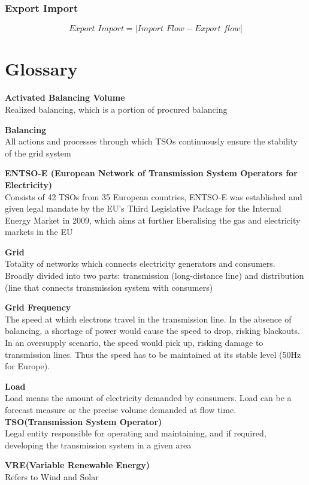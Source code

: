 \documentclass[12pt]{article}
\begin{document}
\begin{appendix}
\subsubsection*{Export Import}
\[\textit{Export Import} = |\textit{Import Flow} - \textit{Export flow}| \]



\newpage
\section{Glossary}
\label{appendix:Glossary}
\textbf{Activated Balancing Volume}\\
Realized balancing, which is a portion of procured balancing\par
\textbf{Balancing}\\
All actions and processes through which TSOs continuously ensure the stability of the grid system\par
\textbf{ENTSO-E (European Network of Transmission System Operators for Electricity)}\\
Consists of 42 TSOs from 35 European countries, ENTSO-E was established and given legal mandate by the EU’s Third Legislative Package for the Internal Energy Market in 2009, which aims at further liberalising the gas and electricity markets in the EU\par
\textbf{Grid}\\
Totality of networks which connects electricity generators and consumers. Broadly divided into two parts: transmission (long-distance line) and distribution (line that connects transmission system with consumers) \par
\textbf{Grid Frequency}\\
The speed at which electrons travel in the transmission line. In the absence of balancing, a shortage of power would cause the speed to drop, risking blackouts. In an oversupply scenario, the speed would pick up, risking damage to transmission lines. Thus the speed has to be maintained at its stable level (50Hz for Europe). \par
\textbf{Load}\\
Load means the amount of electricity demanded by consumers. Load can be a forecast measure or the precise volume demanded at flow time.\\
\textbf{TSO(Transmission System Operator)}\\
Legal entity responsible for operating and maintaining, and if required, developing the transmission system in a given area\par
\textbf{VRE(Variable Renewable Energy)}\\
Refers to Wind and Solar

\newpage
\nocite{*}



\end{appendix}

\hspace{2cm}
\end{document}
